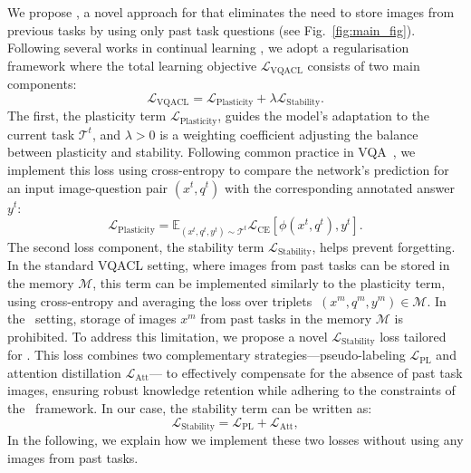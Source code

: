 We propose \textbf{\qstmethodshort{}}, a novel approach for \setting{} that eliminates the need to store images from previous tasks by using only past task questions (see Fig.~\ref{fig:main_fig}). Following several works in continual learning \citep{li2017lwf, dhar2019learning}, we adopt a regularisation framework where the total learning objective $\mathcal{L}_{\text{VQACL}}$ consists of two main components:
\begin{equation}
    \label{eq.trad_feat}
    \mathcal{L}_{\text{VQACL}} =  \mathcal{L}_{\text{Plasticity}}+ \lambda\mathcal{L}_{\text{Stability}}.
\end{equation}
The first, the plasticity term \(\mathcal{L}_{\text{Plasticity}}\), guides the model’s adaptation to the current task $\mathcal{T}^t$, and $\lambda>0$ is a weighting coefficient adjusting the balance between plasticity and stability. Following common practice in VQA~\cite{zhang2023vqacl, Ravi_2023_WACV, Antol_2015_ICCV}, we implement this loss using cross-entropy to compare the network’s prediction for an input image-question pair \((x^t, q^t)\) with the corresponding annotated answer \(y^t\):
\begin{equation}
    \label{eq.trad_feat}
    \mathcal{L}_{\text{Plasticity}} = \mathbb{E}_{(x^t, q^t, y^t) \sim \mathcal{T}^t} \mathcal{L}_{\text{CE}}\left[\phi(x^t, q^t), y^t\right] .
\end{equation}
The second loss component, the stability term \(\mathcal{L}_{\text{Stability}}\), helps prevent forgetting. In the standard VQACL setting, where images from past tasks can be stored in the memory \(\mathcal{M}\), this term can be implemented similarly to the plasticity term, using cross-entropy and averaging the loss over triplets \(~{(x^m, q^m, y^m) \in \mathcal{M}}\).
In the \setting~setting, storage of images \(x^m\) from past tasks in the memory \(\mathcal{M}\) is prohibited. To address this limitation, we propose a novel \(\mathcal{L}_{\text{Stability}}\) loss tailored for \setting. This loss combines two complementary strategies—pseudo-labeling  $\mathcal{L}_{\text{PL}}$ and attention distillation $\mathcal{L}_{\text{Att}}$— to effectively compensate for the absence of past task images, ensuring robust knowledge retention while adhering to the constraints of the \setting~framework. In our case, the stability term can be written as:
\begin{equation}
    \label{eq.trad_feat_stability}
    \mathcal{L}_{\text{Stability}} = \mathcal{L}_{\text{PL}}+\mathcal{L}_{\text{Att}},
\end{equation}
In the following, we explain how we implement these two losses without using any images from past tasks.

